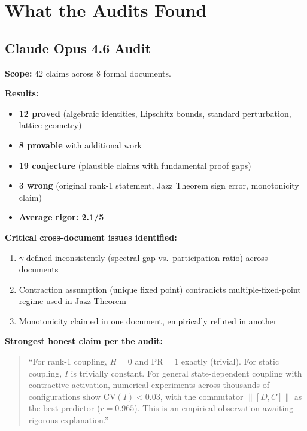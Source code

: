 \documentclass[11pt]{article}
\begin{document}
\section{What the Audits Found}

\subsection{Claude Opus 4.6 Audit}

\textbf{Scope:} 42 claims across 8 formal documents.

\textbf{Results:}
\begin{itemize}
  \item \textbf{12 proved} (algebraic identities, Lipschitz bounds, standard perturbation, lattice geometry)
  \item \textbf{8 provable} with additional work
  \item \textbf{19 conjecture} (plausible claims with fundamental proof gaps)
  \item \textbf{3 wrong} (original rank-1 statement, Jazz Theorem sign error, monotonicity claim)
  \item \textbf{Average rigor: 2.1/5}
\end{itemize}

\textbf{Critical cross-document issues identified:}
\begin{enumerate}
  \item $\gamma$ defined inconsistently (spectral gap vs.\ participation ratio) across documents
  \item Contraction assumption (unique fixed point) contradicts multiple-fixed-point regime used in Jazz Theorem
  \item Monotonicity claimed in one document, empirically refuted in another
\end{enumerate}

\textbf{Strongest honest claim per the audit:}
\begin{quote}
``For rank-1 coupling, $H = 0$ and $\mathrm{PR} = 1$ exactly (trivial). For static coupling, $I$ is trivially constant. For general state-dependent coupling with contractive activation, numerical experiments across thousands of configurations show $\mathrm{CV}(I) < 0.03$, with the commutator $\|[D,C]\|$ as the best predictor ($r = 0.965$). This is an empirical observation awaiting rigorous explanation.''
\end{quote}
\end{document}
